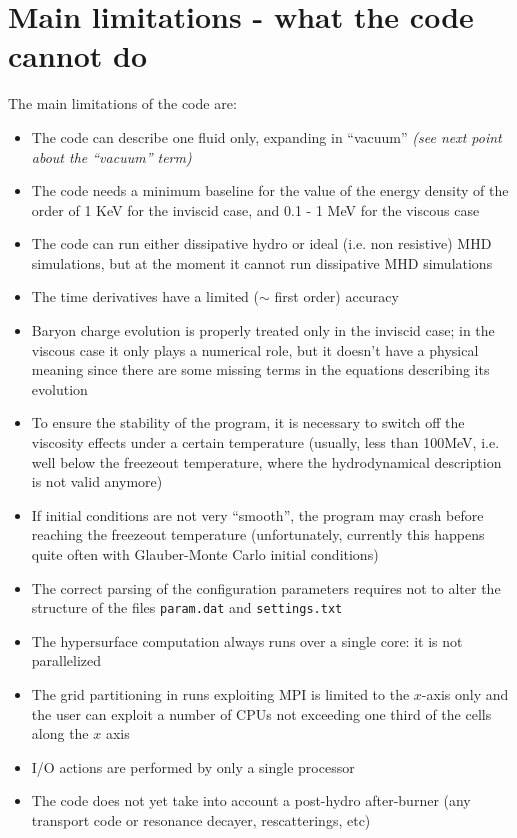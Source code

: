 \section{Main limitations - what the code cannot do}
The main limitations of the code are:\\
\begin{itemize}

\item The code can describe one fluid only, expanding in ``vacuum'' \emph{(see next point about the ``vacuum'' term)}
\item{The code needs a minimum baseline for the value of the energy density of the order of 1 KeV for the inviscid case, and 0.1 - 1 MeV for the viscous case}
\item The code can run either dissipative hydro or ideal (i.e. non resistive) MHD simulations, but at the moment it cannot run dissipative MHD simulations
\item{The time derivatives have a limited ($\sim$ first order) accuracy}
\item{Baryon charge evolution is properly treated only in the inviscid case; in the viscous case it only plays a numerical role, but it doesn't have a physical meaning since there are some missing terms in the equations describing its evolution}
\item{To ensure the stability of the program, it is necessary to switch off the viscosity effects under a certain temperature (usually, less than 100MeV, i.e. well below the freezeout temperature, where the hydrodynamical description is not valid anymore)}
\item{If initial conditions are not very ``smooth'', the program may crash before reaching the freezeout temperature (unfortunately, currently this happens quite often with Glauber-Monte Carlo initial conditions)}
\item{The correct parsing of the configuration parameters requires not to alter the structure of the files {\tt param.dat} and {\tt settings.txt}}
\item{The hypersurface computation always runs over a single core: it is not parallelized}
\item{The grid partitioning in runs exploiting MPI is limited to the $x$-axis only and the user can exploit a number of CPUs not exceeding one third of the cells along the $x$ axis}
\item{I/O actions are performed by only a single processor}
\item{The code does not yet take into account a post-hydro after-burner (any transport code or resonance decayer, rescatterings, etc)}
\end{itemize}


